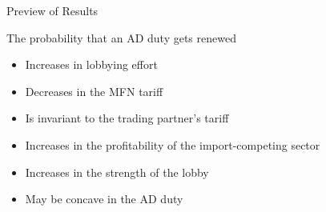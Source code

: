 \documentclass[handout]{beamer}
\begin{document}
 
\begin{frame}{Preview of Results}

\pause
The probability that an AD duty gets renewed
\pause
\begin{itemize}[<+->]
	\item Increases in lobbying effort
	\item Decreases in the MFN tariff
	\item Is invariant to the trading partner's tariff
	\item Increases in the profitability of the import-competing sector
	\item Increases in the strength of the lobby
	\item May be concave in the AD duty
\end{itemize}
\end{frame}

\begin{comment}
\subsection{}
\begin{frame}
\frametitle{Related Literature}
\small Protection for Sale: Grossman $\&$ Helpman (1994)
\begin{itemize}
  \item \footnotesize Empirics: Goldberg $\&$ Maggi (1999), Gawande $\&$ Bandyopadhyay (2000), Mitra, Thomakos, $\&$  Ulubasoglu (2002)
  \item \footnotesize Mitra, Thomakos, $\&$  Ulubasoglu (2006), Bombardini (2008)
	\item \footnotesize Trade Wars and Trade Talks: Grossman $\&$ Helpman (1995)
\end{itemize}

\vskip.05in
\small Political economy shocks
\begin{itemize}
	\item \footnotesize Feenstra $\&$ Lewis (1991), Bagwell $\&$ Staiger (2001, 2005)
\end{itemize}

\vskip.05in
\small Separated powers
\begin{itemize}
	\item \footnotesize Mansfield, Milner $\&$ Rosendorff (2000), Song (2008)
\end{itemize}

\vskip.05in
\small Political uncertainty
\begin{itemize}
	\item \footnotesize Milner $\&$ Rosendorff (1997), Le Breton $\&$ Zaporozhets (2007) %
\end{itemize}
	
\end{frame}
\end{comment}
\end{document}
